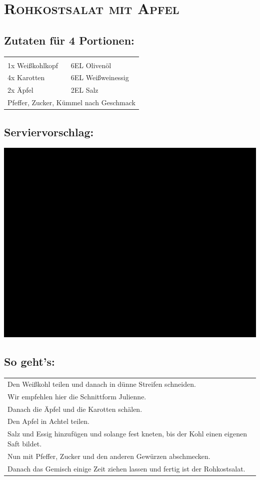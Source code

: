 \section{\textsc{Rohkostsalat mit Apfel}}

\subsection*{Zutaten für 4 Portionen:}

\begin{tabular}{p{7.5cm} p{7.5cm}}
	& \\
	1x Weißkohlkopf & 6EL Olivenöl \\
	4x Karotten & 6EL Weißweinessig \\
	2x Äpfel & 2EL Salz \\
	\multicolumn{2}{l}{Pfeffer, Zucker, Kümmel nach Geschmack}
\end{tabular}

\subsection*{Serviervorschlag:}

\includegraphics[width=\textwidth]{img/ph.jpg} \cite{rohkostapfel}

\subsection*{So geht's:}
\begin{tabular}{p{15cm}}
	\\
	Den Weißkohl teilen und danach in dünne Streifen schneiden.\\
	Wir empfehlen hier die Schnittform Julienne.\\
	Danach die Äpfel und die Karotten schälen.\\
	Den Apfel in Achtel teilen.\\
	Salz und Essig hinzufügen und solange fest kneten, bis der Kohl einen eigenen Saft bildet.\\
	Nun mit Pfeffer, Zucker und den anderen Gewürzen abschmecken.\\
	Danach das Gemisch einige Zeit ziehen lassen und fertig ist der Rohkostsalat.
\end{tabular}